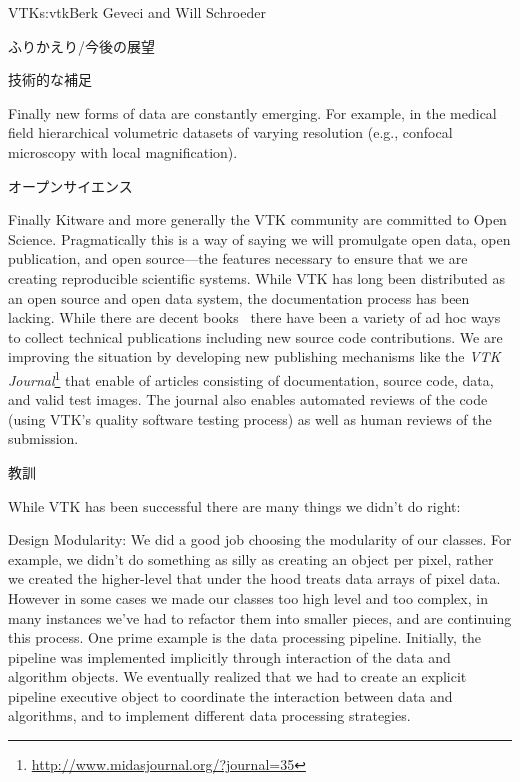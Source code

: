 \begin{aosachapter}{VTK}{s:vtk}{Berk Geveci and Will Schroeder}
\begin{aosasect1}{ふりかえり/今後の展望}
\begin{aosasect2}{技術的な補足}
\begin{aosaitemize}
  \item Finally new forms of data are constantly emerging. For example,
  in the medical field hierarchical volumetric datasets of varying
  resolution (e.g., confocal microscopy with local magnification).

\end{aosaitemize}

\end{aosasect2}

\begin{aosasect2}{オープンサイエンス}

Finally Kitware and more generally the VTK community are committed to
Open Science. Pragmatically this is a way of saying we will promulgate
open data, open publication, and open source---the features necessary
to ensure that we are creating reproducible scientific systems. While
VTK has long been distributed as an open source and open data system,
the documentation process has been lacking. While there are decent
books~\cite{bib:vtk:userguide,bib:vtk:toolkit} there
have been a variety of ad hoc ways to collect technical publications
including new source code contributions. We are improving the
situation by developing new publishing mechanisms like the \emph{VTK
Journal}\footnote{\url{http://www.midasjournal.org/?journal=35}}
that enable of articles consisting of documentation, source code,
data, and valid test images. The journal also enables automated
reviews of the code (using VTK's quality software testing process) as
well as human reviews of the submission.

\end{aosasect2}

\begin{aosasect2}{教訓}

While VTK has been successful there are many things we didn't do
right:

\begin{aosadescription}

  \item{Design Modularity}: We did a good job choosing the
  modularity of our classes. For example, we didn't do something as
  silly as creating an object per pixel, rather we created the
  higher-level  that under the hood treats data arrays of
  pixel data. However in some cases we made our classes too high level
  and too complex, in many instances we've had to refactor them into
  smaller pieces, and are continuing this process. One prime example
  is the data processing pipeline.  Initially, the pipeline was
  implemented implicitly through interaction of the data and algorithm
  objects. We eventually realized that we had to create an explicit
  pipeline executive object to coordinate the interaction between data
  and algorithms, and to implement different data processing
  strategies.


\end{aosadescription}
\end{aosasect2}
\end{aosasect1}
\end{aosachapter}
